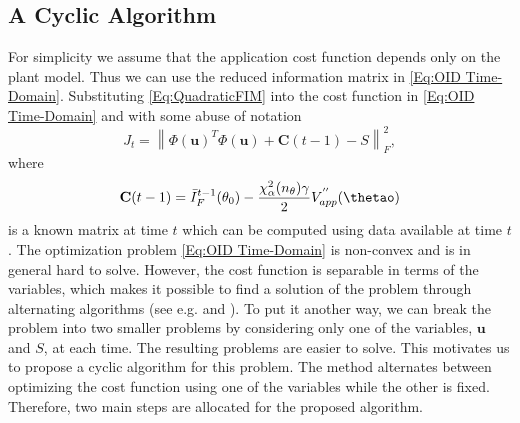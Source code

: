 \documentclass{ifacconf}
\begin{document}
\subsection{A Cyclic Algorithm}
For simplicity we assume that the application cost function depends only on the plant model. Thus we can use the reduced information matrix in \eqref{Eq:OID Time-Domain}. Substituting \eqref{Eq:QuadraticFIM} into the cost function in \eqref{Eq:OID Time-Domain} and with some abuse of notation
\begin{equation}
J_t = \left \| \Phi(\textbf{u})^T\Phi(\textbf{u})+\textbf{C}(t-1) - S  \right \|_F^2,
\end{equation}
where
\begin{align}
\textbf{C}(t-1) = \bar{I}_F^{t-1}(\theta_0) - \frac{\chi^2_\alpha(n_\theta)\gamma}{2}V^{''}_{app}(\thetao)
\end{align}
is a known matrix at time $t$ which can be computed using data available at time $t$.
The optimization problem \eqref{Eq:OID Time-Domain} is non-convex and is in general hard to solve. However, the cost function is separable in terms of the variables, which makes it possible to find a solution of the problem through alternating algorithms (see e.g. \cite{Tropp2005} and \cite{stoica2007}). To put it another way, we can break the problem into two smaller problems by considering only one of the variables, $\textbf{u}$ and $S$, at each time. The resulting problems are easier to solve. This motivates us to propose a cyclic algorithm for this problem. The method alternates between optimizing the cost function using one of the variables while the other is fixed. Therefore, two main steps are allocated for the proposed algorithm.
\end{document}
